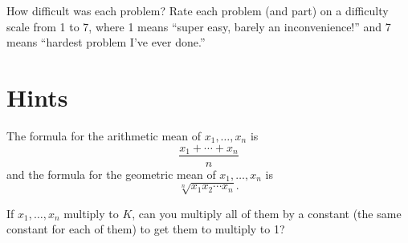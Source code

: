 \begin{problem}
  How difficult was each problem? Rate each problem (and part) on a difficulty scale from 1 to 7, where 1 means ``super easy, barely an inconvenience!'' and 7 means ``hardest problem I've ever done.''
\end{problem}

\newpage

\section{Hints}

\begin{hint}
  The formula for the arithmetic mean of $x_1,\dots,x_n$ is
  \[\frac{x_1+\cdots+x_n}n\]
  and the formula for the geometric mean of $x_1,\dots,x_n$ is
  \[\sqrt[n]{x_1x_2\cdots x_n}.\]
\end{hint}

\begin{hint}
  If $x_1,\dots,x_n$ multiply to $K$, can you multiply all of them by a constant (the same constant for each of them) to get them to multiply to 1?
\end{hint}
